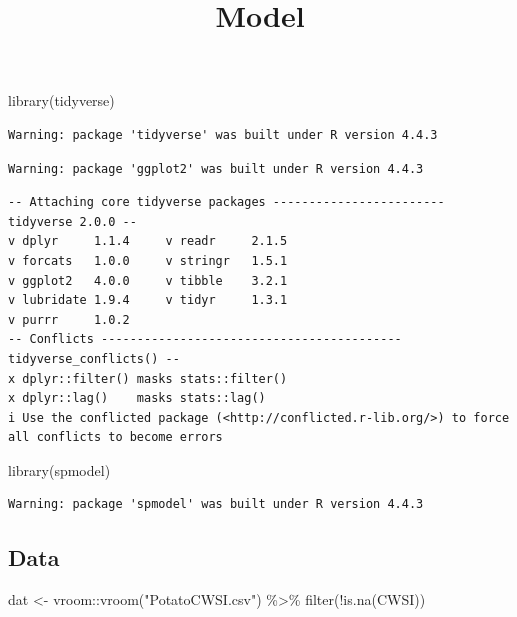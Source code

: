 \documentclass[
  letterpaper,
  DIV=11,
  numbers=noendperiod]{scrartcl}
\title{Model}
\author{}
\date{}
\newenvironment{Shaded}{\begin{snugshade}}{\end{snugshade}}
\newcommand{\FunctionTok}[1]{\textcolor[rgb]{0.28,0.35,0.67}{#1}}
\newcommand{\NormalTok}[1]{\textcolor[rgb]{0.00,0.23,0.31}{#1}}
\newcommand{\OtherTok}[1]{\textcolor[rgb]{0.00,0.23,0.31}{#1}}
\newcommand{\SpecialCharTok}[1]{\textcolor[rgb]{0.37,0.37,0.37}{#1}}
\newcommand{\StringTok}[1]{\textcolor[rgb]{0.13,0.47,0.30}{#1}}
\begin{document}
\maketitle


\begin{Shaded}
\begin{Highlighting}[]
\FunctionTok{library}\NormalTok{(tidyverse)}
\end{Highlighting}
\end{Shaded}

\begin{verbatim}
Warning: package 'tidyverse' was built under R version 4.4.3
\end{verbatim}

\begin{verbatim}
Warning: package 'ggplot2' was built under R version 4.4.3
\end{verbatim}

\begin{verbatim}
-- Attaching core tidyverse packages ------------------------ tidyverse 2.0.0 --
v dplyr     1.1.4     v readr     2.1.5
v forcats   1.0.0     v stringr   1.5.1
v ggplot2   4.0.0     v tibble    3.2.1
v lubridate 1.9.4     v tidyr     1.3.1
v purrr     1.0.2     
-- Conflicts ------------------------------------------ tidyverse_conflicts() --
x dplyr::filter() masks stats::filter()
x dplyr::lag()    masks stats::lag()
i Use the conflicted package (<http://conflicted.r-lib.org/>) to force all conflicts to become errors
\end{verbatim}

\begin{Shaded}
\begin{Highlighting}[]
\FunctionTok{library}\NormalTok{(spmodel)}
\end{Highlighting}
\end{Shaded}

\begin{verbatim}
Warning: package 'spmodel' was built under R version 4.4.3
\end{verbatim}

\subsection{Data}\label{data}

\begin{Shaded}
\begin{Highlighting}[]
\NormalTok{dat }\OtherTok{\textless{}{-}}\NormalTok{ vroom}\SpecialCharTok{::}\FunctionTok{vroom}\NormalTok{(}\StringTok{"PotatoCWSI.csv"}\NormalTok{) }\SpecialCharTok{\%\textgreater{}\%} \FunctionTok{filter}\NormalTok{(}\SpecialCharTok{!}\FunctionTok{is.na}\NormalTok{(CWSI))}
\end{Highlighting}
\end{Shaded}
\end{document}
